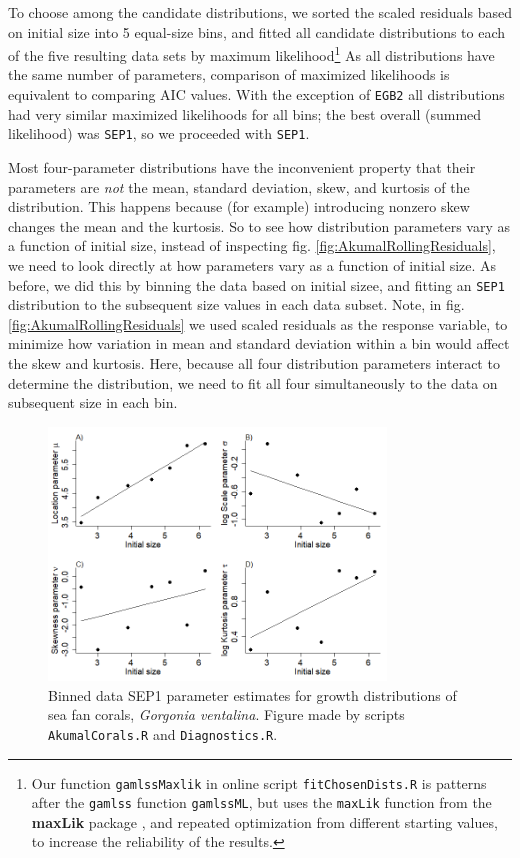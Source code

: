 \documentclass[11pt]{article}
\begin{document}
{To choose among the candidate distributions, we sorted the scaled residuals based on initial size into 5 equal-size bins, 
and fitted all candidate distributions to each of the five resulting data sets by 
maximum likelihood\footnote{Our function \texttt{gamlssMaxlik} in online script \texttt{fitChosenDists.R} is
patterns after the \texttt{gamlss} function \texttt{gamlssML}, but uses the \texttt{maxLik} function from the \textbf{maxLik}
package \citep{maxLik-package}, and repeated optimization from different starting values, to increase the reliability of the results.} 
As all distributions have the same number of parameters, comparison of maximized likelihoods is equivalent to comparing AIC values. 
With the exception of \texttt{EGB2} all distributions had very similar maximized likelihoods for all bins; the best overall (summed
likelihood) was \texttt{SEP1}, so we proceeded with \texttt{SEP1}. 

Most four-parameter distributions have the inconvenient property that their parameters are \emph{not} the mean, standard deviation, skew,
and kurtosis of the distribution. This happens because (for example) introducing nonzero skew changes the mean and the kurtosis. 
So to see how distribution parameters vary as a function of initial size, instead of inspecting fig. \ref{fig:AkumalRollingResiduals}, we need
to look directly at how parameters vary as a function of initial size. As before, we did this by binning the data based on initial sizee, 
and fitting an \texttt{SEP1} distribution to the subsequent size values in each data subset. Note, 
in fig. \ref{fig:AkumalRollingResiduals} we used scaled residuals as the response variable, 
to minimize how variation in mean and standard deviation within a bin would affect the skew and kurtosis. 
Here, because all four distribution parameters interact to determine the distribution, we need to fit all 
four simultaneously to the data on subsequent size in each bin. 

\begin{figure}[tbp]
\centering
\includegraphics[width=0.8\textwidth]{figures/RollingSEP1parsCorals.png}
\caption{Binned data SEP1 parameter estimates for growth distributions of sea fan corals, \emph{Gorgonia ventalina}. 
Figure made by scripts \texttt{AkumalCorals.R} and \texttt{Diagnostics.R}.}
\label{fig:AkumalRollingSEP1pars}
\end{figure} 

}
\end{document}

